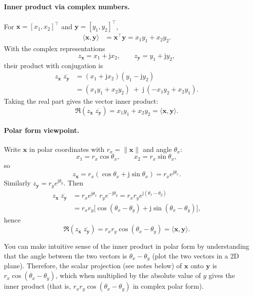 \documentclass{ee102_notes}
\begin{document}
\paragraph{Inner product via complex numbers.}
For $\mathbf{x}=[x_1,x_2]^{\top}$ and $\mathbf{y}=[y_1,y_2]^{\top}$,
\begin{align*}
\langle \mathbf{x},\mathbf{y}\rangle
&= \mathbf{x}^{\top}\mathbf{y}
= x_1y_1+x_2y_2 .
\end{align*}
With the complex representations
\[
z_{\mathbf{x}}=x_1+\mathrm{j}x_2,\qquad
z_{\mathbf{y}}=y_1+\mathrm{j}y_2,
\]
their product with conjugation is
\begin{align*}
z_{\mathbf{x}}\;\overline{z_{\mathbf{y}}}
&=(x_1+\mathrm{j}x_2)(y_1-\mathrm{j}y_2) \\
&=(x_1y_1+x_2y_2)\;+\;\mathrm{j}\,(-x_1y_2+x_2y_1).
\end{align*}
Taking the real part gives the vector inner product:
\[
\Re\!\left(z_{\mathbf{x}}\;\overline{z_{\mathbf{y}}}\right)=x_1y_1+x_2y_2
=\langle \mathbf{x},\mathbf{y}\rangle .
\]

\paragraph{Polar form viewpoint.}
Write $\mathbf{x}$ in polar coordinates with $r_x=\|\mathbf{x}\|$ and angle
$\theta_x$:
\[
x_1=r_x\cos\theta_x,\qquad x_2=r_x\sin\theta_x,
\]
so
\[
z_{\mathbf{x}}=r_x(\cos\theta_x+\mathrm{j}\sin\theta_x)=r_x e^{\mathrm{j}\theta_x}.
\]
Similarly $z_{\mathbf{y}}=r_y e^{\mathrm{j}\theta_y}$. Then
\begin{align*}
z_{\mathbf{x}}\;\overline{z_{\mathbf{y}}}
&= r_x e^{\mathrm{j}\theta_x}\; r_y e^{-\mathrm{j}\theta_y}
= r_x r_y e^{\mathrm{j}(\theta_x-\theta_y)} \\
&= r_x r_y\Big[\cos(\theta_x-\theta_y)
  + \mathrm{j}\sin(\theta_x-\theta_y)\Big],
\end{align*}
hence
\[
\Re\!\left(z_{\mathbf{x}}\;\overline{z_{\mathbf{y}}}\right)
= r_x r_y \cos(\theta_x-\theta_y)
= \langle \mathbf{x},\mathbf{y}\rangle .
\]

You can make intuitive sense of the  inner product in polar form by understanding that the angle between the two vectors is $\theta_x - \theta_y$ (plot the two vectors in a 2D plane). Therefore, the scalar projection (see notes below) of $\textbf{x}$ onto $\textbf{y}$ is $r_x \cos(\theta_x - \theta_y)$, which when multiplied by the absolute value of $y$ gives the inner product (that is, $r_xr_y\cos(\theta_x - \theta_y)$ in complex polar form). 
\end{document}
